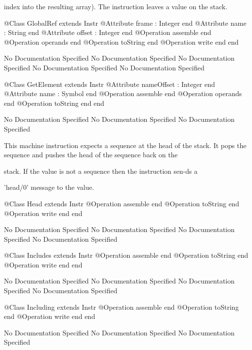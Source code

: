       index into the resulting array). The instruction leaves a value 
      on the stack.
\begin{Interface}
@Class GlobalRef extends Instr
  @Attribute frame : Integer end
  @Attribute name : String end
  @Attribute offset : Integer end
  @Operation assemble end
  @Operation operands end
  @Operation toString end
  @Operation write end
end
\end{Interface}
No Documentation Specified
No Documentation Specified
No Documentation Specified
No Documentation Specified
No Documentation Specified
\begin{Interface}
@Class GetElement extends Instr
  @Attribute nameOffset : Integer end
  @Attribute name : Symbol end
  @Operation assemble end
  @Operation operands end
  @Operation toString end
end
\end{Interface}
No Documentation Specified
No Documentation Specified
No Documentation Specified

      This machine instruction expects a sequence at the head of the stack.
      It pops the sequence and pushes the head of the sequence back on the

      stack. If the value is not a sequence then the instruction sen-ds a

      'head/0' message to the value.
\begin{Interface}
@Class Head extends Instr
  @Operation assemble end
  @Operation toString end
  @Operation write end
end
\end{Interface}
No Documentation Specified
No Documentation Specified
No Documentation Specified
No Documentation Specified
\begin{Interface}
@Class Includes extends Instr
  @Operation assemble end
  @Operation toString end
  @Operation write end
end
\end{Interface}
No Documentation Specified
No Documentation Specified
No Documentation Specified
No Documentation Specified
\begin{Interface}
@Class Including extends Instr
  @Operation assemble end
  @Operation toString end
  @Operation write end
end
\end{Interface}
No Documentation Specified
No Documentation Specified
No Documentation Specified

